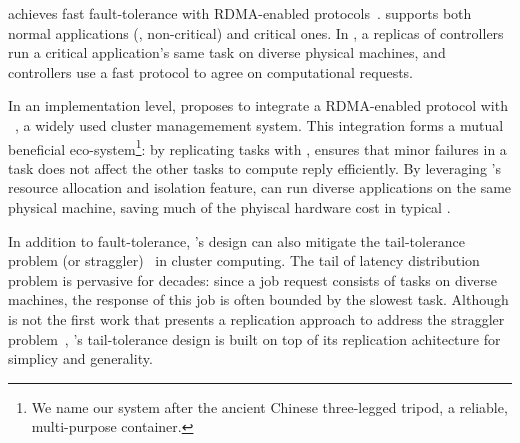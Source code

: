 \xxx achieves fast fault-tolerance with RDMA-enabled 
\paxos protocols~\cite{dare:hpdc15,falcon:github}. \xxx supports both normal 
applications (\ie, non-critical) and critical ones. In \xxx, a replicas of 
controllers run a critical application's same task on diverse physical 
machines, and controllers use a fast \paxos protocol to agree on computational 
requests. 

In an implementation level, \xxx proposes to integrate a RDMA-enabled \paxos 
protocol with \mesos~\cite{mesos}, a widely used cluster managemement system. 
This integration forms a mutual beneficial eco-system\footnote{We name our 
system after the ancient Chinese three-legged tripod, a reliable, multi-purpose 
container.}: by replicating tasks with \paxos, \xxx ensures that minor failures 
in a task does not affect the other tasks to compute reply efficiently. By 
leveraging \mesos's resource allocation and isolation feature, \xxx can run 
diverse applications on the same physical machine, saving much of the phyiscal 
hardware cost in typical \paxos.




In addition to fault-tolerance, \xxx's design can also mitigate the 
tail-tolerance problem (or straggler)~\cite{tail:scale} in cluster computing. 
The tail of latency distribution problem is pervasive for decades: since a 
job request consists of tasks on diverse machines, the response of this 
job is often bounded by the slowest task. Although \xxx is not the first work 
that presents a replication approach to address the straggler 
problem~\cite{dolly:nsdi13}, \xxx's tail-tolerance design is built on top of its 
\paxos replication achitecture for simplicy and generality.


